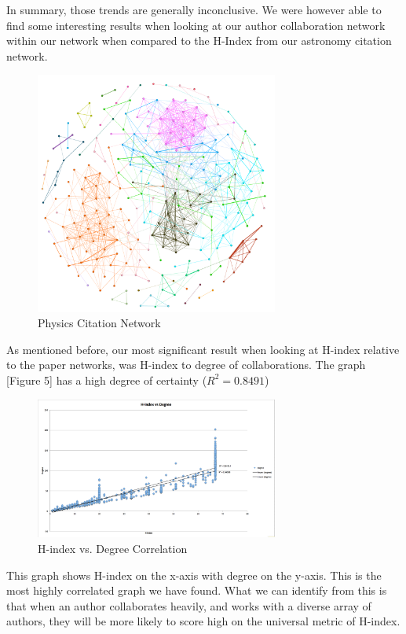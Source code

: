 \documentclass[times, 10pt,twocolumn]{article}
\begin{document}
In summary, those trends are generally inconclusive. We were however able to find some interesting results when looking at our author collaboration network within our network when compared to the H-Index from our astronomy citation network. \\

\begin{figure}[h]
   \includegraphics[width=8cm]{figure4.png}
   \caption{Physics Citation Network}
\end{figure}

As mentioned before, our most significant result when looking at H-index relative to the paper networks, was H-index to degree of collaborations. The graph [Figure 5] has a high
degree of certainty ($R^2 = 0.8491$)  \\

\begin{figure}[h]
   \includegraphics[width=8cm]{figure5.png}
   \caption{H-index vs. Degree Correlation}
\end{figure}

This graph shows H-index on the x-axis with degree on the y-axis. This is the most highly correlated graph we have found. What we can identify from this is that when an author collaborates heavily, and works with a diverse array of authors, they will be more likely to score high on the universal metric of H-index. \\
\end{document}
